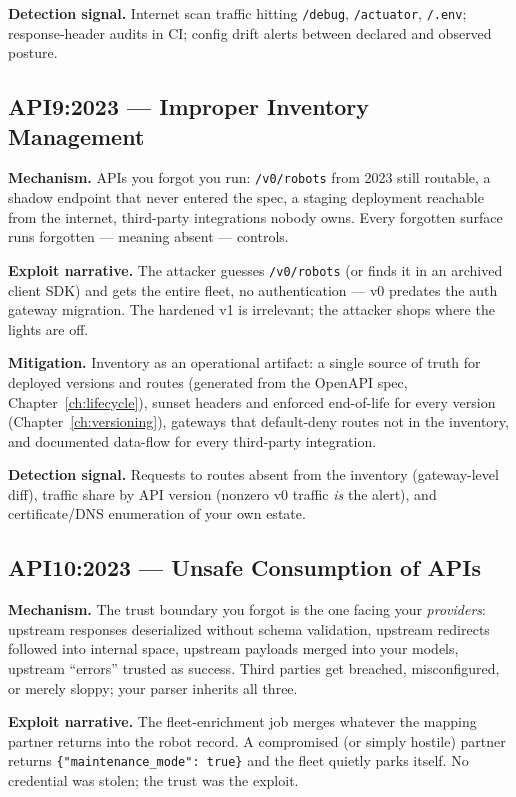 \textbf{Detection signal.} Internet scan traffic hitting \texttt{/debug},
\texttt{/actuator}, \texttt{/.env}; response-header audits in CI; config
drift alerts between declared and observed posture.

\subsection{API9:2023 --- Improper Inventory Management}
\label{sec:ch16-api9}

\textbf{Mechanism.} APIs you forgot you run: \texttt{/v0/robots} from 2023
still routable, a shadow endpoint that never entered the spec, a staging
deployment reachable from the internet, third-party integrations nobody
owns. Every forgotten surface runs forgotten --- meaning absent ---
controls.

\textbf{Exploit narrative.} The attacker guesses \texttt{/v0/robots} (or
finds it in an archived client SDK) and gets the entire fleet, no
authentication --- v0 predates the auth gateway migration. The hardened v1
is irrelevant; the attacker shops where the lights are off.

\textbf{Mitigation.} Inventory as an operational artifact: a single source
of truth for deployed versions and routes (generated from the OpenAPI spec,
Chapter~\ref{ch:lifecycle}), sunset headers and enforced end-of-life for
every version (Chapter~\ref{ch:versioning}), gateways that default-deny
routes not in the inventory, and documented data-flow for every third-party
integration.

\textbf{Detection signal.} Requests to routes absent from the inventory
(gateway-level diff), traffic share by API version (nonzero v0 traffic
\emph{is} the alert), and certificate/DNS enumeration of your own estate.

\subsection{API10:2023 --- Unsafe Consumption of APIs}
\label{sec:ch16-api10}

\textbf{Mechanism.} The trust boundary you forgot is the one facing your
\emph{providers}: upstream responses deserialized without schema
validation, upstream redirects followed into internal space, upstream
payloads merged into your models, upstream ``errors'' trusted as success.
Third parties get breached, misconfigured, or merely sloppy; your parser
inherits all three.

\textbf{Exploit narrative.} The fleet-enrichment job merges whatever the
mapping partner returns into the robot record. A compromised (or simply
hostile) partner returns \texttt{\{"maintenance\_mode": true\}} and the
fleet quietly parks itself. No credential was stolen; the trust was the
exploit.

